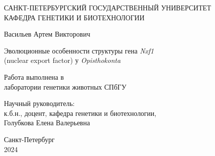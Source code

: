 \newpage
\begin{titlepage}

\begin{center}
    САНКТ-ПЕТЕРБУРГСКИЙ ГОСУДАРСТВЕННЫЙ УНИВЕРСИТЕТ \\ КАФЕДРА ГЕНЕТИКИ И БИОТЕХНОЛОГИИ
    \vspace{5cm}

    Васильев Артем Викторович
    \vspace{1cm}

    Эволюционные особенности структуры гена \textit{Nxf1} \\ (nuclear export factor) у \textit{Opisthokonta}
\end{center}

\vfill

\begin{flushright}
    Работа выполнена в \\ лаборатории генетики животных СПбГУ \\

    \vspace{1cm}

    Научный руководитель: \\ к.б.н., доцент, кафедра генетики и биотехнологии, \\ Голубкова Елена Валерьевна \\
\end{flushright}

\vfill

\begin{center}
    Санкт-Петербург \\ 2024
\end{center}

\end{titlepage}

\setcounter{page}{2} %
